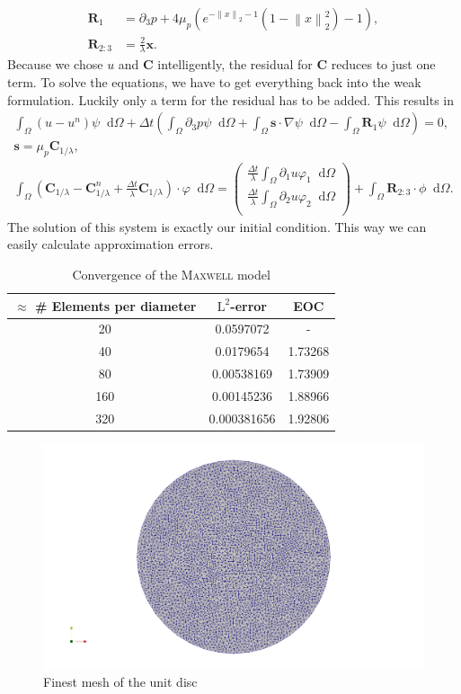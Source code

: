 \documentclass[12pt,a4paper,twoside, open=right]{scrreprt}
\theoremstyle{definition}
\theoremstyle{plain}
\newcommand{\norm}[1]{\left\lVert#1\right\rVert}
\newcommand{\bfs}{\bm{s}}
\newcommand{\bfC}{\bm{C}}
\newcommand{\bfx}{\bm{x}}
\newcommand{\bfR}{\bm{R}}
\newcommand{\D}{\mathop{}\!\mathrm{d}}
\begin{document}
\begin{align}
   \bfR_1 &= \partial_3 p +4\mu_p(e^{-\norm{x}_2 -1}(1-\norm{x}_2^2)-1),\\
   \bfR_{2:3} &= \frac{2}{\lambda}\bfx.
\end{align}
Because we chose $u$ and $\bfC$ intelligently, the residual for $\bfC$ reduces to just one term. To solve the equations, we have to get everything back into the weak formulation. Luckily only a term for the residual has to be added. This results in 
\begin{align}
\int_\Omega(u-u^n)\psi\D\Omega +\Delta t\left(\int_\Omega\partial_3 p\psi\D\Omega + \int_\Omega\bfs\cdot\nabla\psi\D\Omega-\int_\Omega \bfR_1\psi\D\Omega\right) = 0,\\
\bfs =\mu_p\bfC_{1/\lambda},\\
\int_\Omega(\bfC_{1/\lambda} - \bfC_{1/\lambda}^n +\frac{\Delta t}{\lambda}\bfC_{1/\lambda})\cdot\varphi\D\Omega = 
\begin{pmatrix}
\frac{\Delta t}{\lambda}\int_\Omega\partial_1 u\varphi_1\D\Omega\\\frac{\Delta t}{\lambda}\int_\Omega\partial_2 u\varphi_2\D\Omega\\
\end{pmatrix}+\int_{\Omega}\bfR_{2:3}\cdot\phi\D\Omega.
\end{align}
The solution of this system is exactly our initial condition. This way we can easily calculate approximation errors. 
\begin{table}
    \centering
    \begin{tabular}{c|c|c}
        $\approx$ \# Elements per diameter& $\mathrm{L}^2$-error&EOC\\
        \hline
        20 & 0.0597072 & -\\
        40 & 0.0179654 & 1.73268\\
        80 & 0.00538169 & 1.73909\\
        160 & 0.00145236 & 1.88966\\
        320 & 0.000381656 & 1.92806
    \end{tabular}
\caption{Convergence of the \textsc{Maxwell} model}
\label{tab:maxwellconv}
\end{table}
\begin{figure}
    
    
    \includegraphics[width=\textwidth]{mesh}
    \caption{Finest mesh of the unit disc}
    \label{fig:mesh}
\end{figure}
\end{document}
